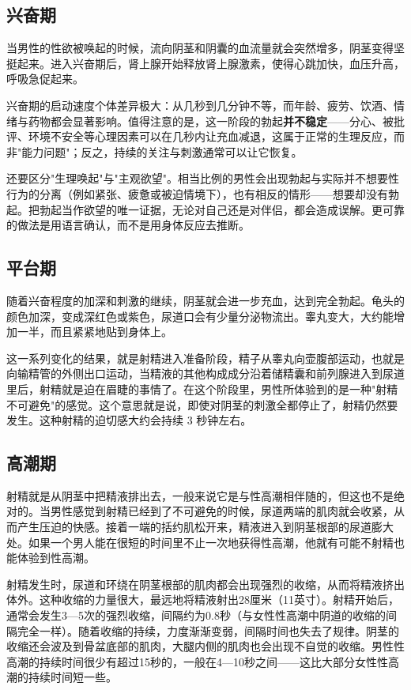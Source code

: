 \subsection{兴奋期}

当男性的性欲被唤起的时候，流向阴茎和阴囊的血流量就会突然增多，阴茎变得坚挺起来。进入兴奋期后，肾上腺开始释放肾上腺激素，使得心跳加快，血压升高，呼吸急促起来。


兴奋期的启动速度个体差异极大：从几秒到几分钟不等，而年龄、疲劳、饮酒、情绪与药物都会显著影响。值得注意的是，这一阶段的勃起\textbf{并不稳定}——分心、被批评、环境不安全等心理因素可以在几秒内让充血减退，这属于正常的生理反应，而非"能力问题"；反之，持续的关注与刺激通常可以让它恢复。

还要区分"生理唤起"与"主观欲望"。相当比例的男性会出现勃起与实际并不想要性行为的分离（例如紧张、疲惫或被迫情境下），也有相反的情形——想要却没有勃起。把勃起当作欲望的唯一证据，无论对自己还是对伴侣，都会造成误解。更可靠的做法是用语言确认，而不是用身体反应去推断。

\subsection{平台期}

随着兴奋程度的加深和刺激的继续，阴茎就会进一步充血，达到完全勃起。龟头的颜色加深，变成深红色或紫色，尿道口会有少量分泌物流出。睾丸变大，大约能增加一半，而且紧紧地贴到身体上。

这一系列变化的结果，就是射精进入准备阶段，精子从睾丸向壶腹部运动，也就是向输精管的外侧出口运动，当精液的其他构成成分沿着储精囊和前列腺进入到尿道里后，射精就是迫在眉睫的事情了。在这个阶段里，男性所体验到的是一种"射精不可避免"的感觉。这个意思就是说，即使对阴茎的刺激全都停止了，射精仍然要发生。这种射精的迫切感大约会持续 3 秒钟左右。

\subsection{高潮期}

射精就是从阴茎中把精液排出去，一般来说它是与性高潮相伴随的，但这也不是绝对的。当男性感觉到射精已经到了不可避免的时候，尿道两端的肌肉就会收紧，从而产生压迫的快感。接着一端的括约肌松开来，精液进入到阴茎根部的尿道膨大处。如果一个男人能在很短的时间里不止一次地获得性高潮，他就有可能不射精也能体验到性高潮。

射精发生时，尿道和环绕在阴茎根部的肌肉都会出现强烈的收缩，从而将精液挤出体外。这种收缩的力量很大，最远地将精液射出28厘米（11英寸）。射精开始后，通常会发生3—5次的强烈收缩，间隔约为0.8秒（与女性性高潮中阴道的收缩的间隔完全一样）。随着收缩的持续，力度渐渐变弱，间隔时间也失去了规律。阴茎的收缩还会波及到骨盆底部的肌肉，大腿内侧的肌肉也会出现不自觉的收缩。男性性高潮的持续时间很少有超过15秒的，一般在4—10秒之间——这比大部分女性性高潮的持续时间短一些。

